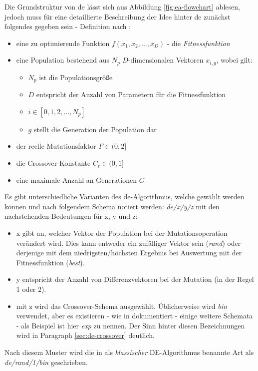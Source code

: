 		Die Grundstruktur von \gls{de} lässt sich aus Abbildung 
		\ref{fig:ea-flowchart} ablesen, jedoch muss für eine detaillierte 
		Beschreibung der Idee hinter \gls{de} zunächst folgendes gegeben sein - 
		Definition nach \cite{storn-price-de}:
		\begin{itemize}
			\item eine zu optimierende Funktion $f(x_{1}, x_{2}, ... , x_{D})$ - die \textit{Fitnessfunktion}
			\item eine Population bestehend aus $N_{p}$ $D$-dimensionalen Vektoren $x_{i, g}$, wobei gilt:
			\begin{itemize}
				\item $N_{p}$ ist die Populationsgröße
				\item $D$ entspricht der Anzahl von Parametern für die Fitnessfunktion
				\item $i \in [0,1,2, ... , N_{p}]$
				\item $g$ stellt die Generation der Population dar
			\end{itemize}
			\item der reelle Mutationsfaktor $F \in (0,2]$
			\item die Crossover-Konstante $C_{r} \in (0,1]$
			\item eine maximale Anzahl an Generationen $G$
		\end{itemize}
		
		
		Es gibt unterschiedliche Varianten des \gls{de}-Algorithmus, welche 
		gewählt werden können und nach folgendem Schema notiert werden: 
		\textit{\gls{de}/x/y/z} mit den nachstehenden Bedeutungen für x, y 
		und z:
		\begin{itemize}
			\item x gibt an, welcher Vektor der Population bei der 
			Mutationsoperation verändert wird. Dies kann entweder ein 
			zufälliger Vektor sein (\textit{rand}) oder derjenige mit dem 
			niedrigsten/höchsten Ergebnis bei Auswertung mit der 
			Fitnessfunktion (\textit{best}).
			\item y entspricht der Anzahl von Differenzvektoren bei der 
			Mutation (in der Regel 1 oder 2).
			\item mit z wird das Crossover-Schema ausgewählt. Üblicherweise 
			wird \textit{bin} verwendet, aber es existieren - wie in 
			\mbox{\cite[Seiten 93-97]{storn-price-de-book}} dokumentiert - 
			einige weitere Schemata - als Beispiel ist hier \textit{exp} zu 
			nennen. Der Sinn hinter diesen Bezeichnungen wird in Paragraph 
			\ref{sec:de-crossover} deutlich.
		\end{itemize}
		Nach diesem Muster wird die in \cite[Seite 47]{storn-price-de-book} 
		als \textit{klassischer} DE-Algorithmus benannte Art als 
		\textit{\gls{de}/rand/1/bin} geschrieben.\\
		
